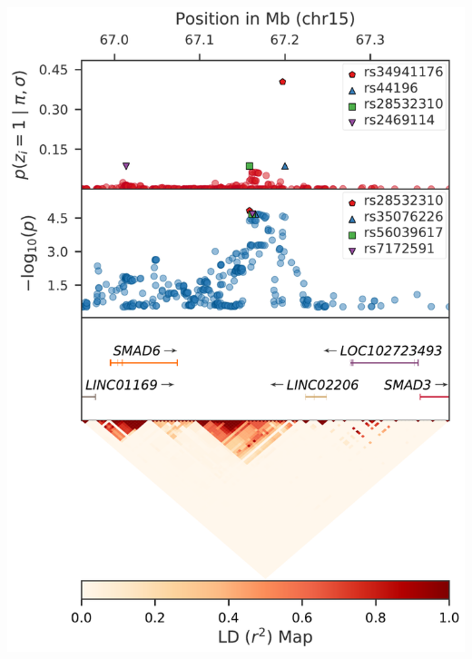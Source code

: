 \documentclass[a0paper,portrait,debug]{baposter}
\begin{document}
\begin{poster}
{\begin{center}
    \includegraphics[height=\myfigheight, keepaspectratio]{Locus_018.pdf}

\end{center}}
\end{poster}
\end{document}
